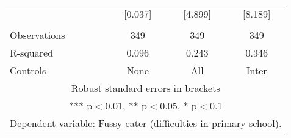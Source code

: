 \begin{tabular}{lccc}
 & [0.037] & [4.899] & [8.189] \\
 &  &  &  \\
Observations & 349 & 349 & 349 \\
R-squared & 0.096 & 0.243 & 0.346 \\
 Controls & None & All & Inter \\ \hline
\multicolumn{4}{c}{ Robust standard errors in brackets} \\
\multicolumn{4}{c}{ *** p$<$0.01, ** p$<$0.05, * p$<$0.1} \\
\multicolumn{4}{c}{ Dependent variable: Fussy eater (difficulties in primary school).} \\
\end{tabular}
